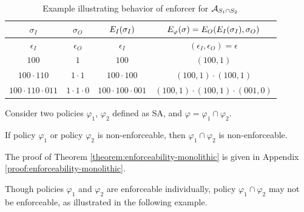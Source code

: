 %
\begin{table}[t]
	\centering
	\scalebox{0.8}
	{
		\begin{tabular}{|c|c|c|c|}
			\hline
			$\sigma_I$ & $\sigma_O$ & $E_{I}(\sigma_I)$ & $E_{\varphi}(\sigma)=E_{O}(E_{I}(\sigma_I), \sigma_O)$ \\
			\hline%
			$\epsilon_I$ & $\epsilon_O$ & $\epsilon_I$ & $(\epsilon_I,\epsilon_O) = \epsilon$\\
			\hline
			$100$ & $1$ & $100$ & $(100,1)$ \\
			\hline
			$100\cdot110$ & $1\cdot1$ & $100\cdot100$ & $(100,1)\cdot(100,1)$ \\
			\hline
			$100\cdot110\cdot011$ & $1\cdot1 \cdot0$ & $100\cdot 100 \cdot 001$ & $(100,1)\cdot(100,1) \cdot(001,0)$ \\
			
			\hline
		\end{tabular}
	}
	\caption{Example illustrating behavior of enforcer for ${\cal A}_{S_1 \cap S_2}$}
	\label{table:EgEnf}
\end{table}


\begin{theorem}
	\label{theorem:enforceability-monolithic}
	Consider two policies $\varphi_1$, $\varphi_2$ defined as SA, and $\varphi = \varphi_1 \cap \varphi_2$.
	
	If policy $\varphi_1$  or policy $\varphi_2$ is non-enforceable, then $\varphi_1 \cap \varphi_2$ is non-enforceable.
	
	The proof of Theorem \ref{theorem:enforceability-monolithic} is given in Appendix \ref{proof:enforceability-monolithic}.
\end{theorem}	

\begin{remark}
	Though policies $\varphi_1$ and $\varphi_2$ are enforceable individually, policy $\varphi_1 \cap \varphi_2$ may not be enforceable, as illustrated in the following example.
\end{remark}


